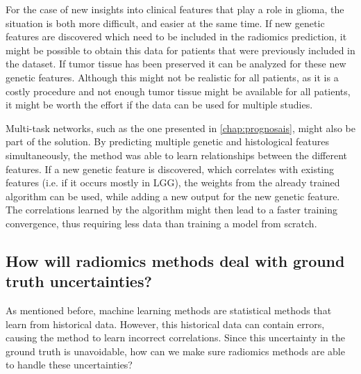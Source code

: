 For the case of new insights into clinical features that play a role in glioma, the situation is both more difficult, and easier at the same time.
If new genetic features are discovered which need to be included in the radiomics prediction, it might be possible to obtain this data for patients that were previously included in the dataset.
If \gls{tumor} tissue has been preserved it can be analyzed for these new genetic features.
Although this might not be realistic for all patients, as it is a costly procedure and not enough \gls{tumor} tissue might be available for all patients, it might be worth the effort if the data can be used for multiple studies.

Multi-task networks, such as the one presented in \cref{chap:prognosais}, might also be part of the solution.
By predicting multiple genetic and histological features simultaneously, the method was able to learn relationships between the different features.
If a new genetic feature is discovered, which correlates with existing features (i.e. if it occurs mostly in \gls{LGG}), the weights from the already trained algorithm can be used, while adding a new output for the new genetic feature.
The correlations learned by the algorithm might then lead to a faster training convergence, thus requiring less data than training a model from scratch.



\subsection{How will radiomics methods deal with ground truth uncertainties?}

As mentioned before, machine learning methods are statistical methods that learn from historical data.
However, this historical data can contain errors, causing the method to learn incorrect correlations.
Since this uncertainty in the ground truth is unavoidable, how can we make sure radiomics methods are able to handle these uncertainties?

